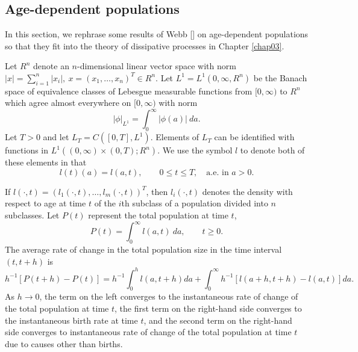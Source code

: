\documentclass{surv-l}
\theoremstyle{plain}
\theoremstyle{definition}
\numberwithin{equation}{section}
\numberwithin{figure}{chapter}
\begin{document}
\subsection{Age-dependent populations}\label{subsec4.9.7} In this section, we rephrase some results of Webb [\citeyear{1985w}] on age-dependent populations so that they fit into the theory of dissipative processes in Chapter \ref{chap03}.

Let $R^{n}$ denote an $n$-dimensional linear vector space with norm $|x|=\sum_{i=1}^{n}|x_{i}|,\ x=(x_{1},\ldots, x_{n})^{T}\in R^{n}$. Let $L^{1}=L^{1}(0, \infty, R^{n})$ be the Banach space of equivalence classes of Lebesgue measurable functions from $[0, \infty)$ to $R^{n}$ which agree almost everywhere on $[0, \infty)$ with norm
\begin{equation*}
|\phi|_{L^{1}}=\int_{0}^{\infty}|\phi(a)|\ da.
\end{equation*}
Let $T>0$ and let $L_{T}=C([0, T], L^{1})$. Elements of $L_{T}$ can be identified with functions in $L^{1}((0, \infty)\times(0, T); R^{n})$. We use the symbol $l$ to denote both of these elements in that
\begin{equation*}
l(t)(a)=l(a, t),\qquad 0\leq t\leq T,\quad \text{a.e. in } a>0.
\end{equation*}

If $l(\cdot, t)=(l_{1}(\cdot, t),\ldots, l_{m}(\cdot, t))^{T}$, then $l_{i}(\cdot, t)$ denotes the density with respect to age at time $t$ of the $i$th subclass of a population divided into $n$ subclasses. Let $P(t)$ represent the total population at time $t$,
\begin{equation}\label{chap04:eq9.21}
P(t)=\int_{0}^{\infty}l(a, t)\ da,\qquad t\geq 0.
\end{equation}
The average rate of change in the total population size in the time interval $(t, t+h)$ is
\begin{equation*}
h^{-1}[P(t+h)-P(t)]=h^{-1}\int_{0}^{h}l(a, t+h)da+\int_{0}^{\infty}h^{-1}[l(a+h, t+h)-l(a, t)]da.
\end{equation*}
As $h\rightarrow 0$, the term on the left converges to the instantaneous rate of change of the total population at time $t$, the first term on the right-hand side converges to the instantaneous birth rate at time $t$, and the second term on the right-hand side converges to instantaneous rate of change of the total population at time $t$ due to causes other than births.
\end{document}

